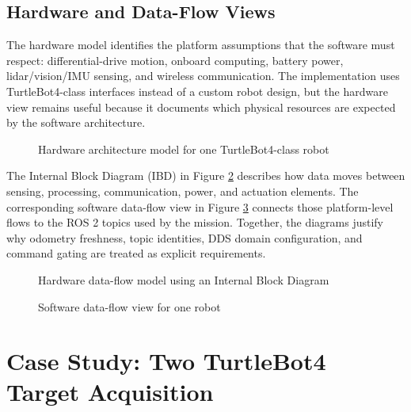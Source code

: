 \documentclass{ieeeaccess}
\begin{document}
\subsection{Hardware and Data-Flow Views}
The hardware model identifies the platform assumptions that the software must respect: differential-drive motion, onboard computing, battery power, lidar/vision/IMU sensing, and wireless communication. The implementation uses TurtleBot4-class interfaces instead of a custom robot design, but the hardware view remains useful because it documents which physical resources are expected by the software architecture.

 \begin{figure}[htbp]
  \centering
  
  \caption{Hardware architecture model for one TurtleBot4-class robot}
  \label{fig_HardwareArchitecture}
\end{figure}

The Internal Block Diagram (IBD) in Figure \ref{fig_IBD_DataFlow} describes how data moves between sensing, processing, communication, power, and actuation elements. The corresponding software data-flow view in Figure \ref{fig_SoftwareDataFlow} connects those platform-level flows to the ROS 2 topics used by the mission. Together, the diagrams justify why odometry freshness, topic identities, DDS domain configuration, and command gating are treated as explicit requirements.

\begin{figure}[htbp]
  \centering
  
  \caption{Hardware data-flow model using an Internal Block Diagram}
  \label{fig_IBD_DataFlow}
\end{figure}

\begin{figure}[htbp]
  \centering
  
  \caption{Software data-flow view for one robot}
  \label{fig_SoftwareDataFlow}
\end{figure}

\section{Case Study: Two TurtleBot4 Target Acquisition}
\end{document}
